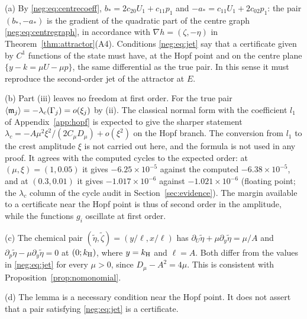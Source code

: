 \begin{remark}\label{neg:rem:jet}
(a) By \eqref{neg:eq:centrecoeff}, $b_*=2c_{20}U_1+c_{11}p_1$ and $-a_*=c_{11}U_1+2c_{02}p_1$: the pair $(b_*,-a_*)$ is the gradient of the quadratic part of the centre graph \eqref{neg:eq:centregraph}, in accordance with $\nabla h=(\zeta,-\eta)$ in Theorem~\ref{thm:attractor}(A4). Conditions \eqref{neg:eq:jet} say that a certificate given by $C^1$ functions of the state must have, at the Hopf point and on the centre plane $\{y-k=\mu U-\mu p\}$, the same differential as the true pair. In this sense it must reproduce the second-order jet of the attractor at $E$.

(b) Part (iii) leaves no freedom at first order. For the true pair $\left\langle \mathfrak m_j\right\rangle=-\lambda_c(\Gamma_j)=o(\xi_j)$ by (ii). The classical normal form with the coefficient $l_1$ of Appendix~\ref{app:hopf} is expected to give the sharper statement $\lambda_c=-A\mu^2\xi^2/(2C_\mu D_\mu)+o(\xi^2)$ on the Hopf branch. The conversion from $l_1$ to the crest amplitude $\xi$ is not carried out here, and the formula is not used in any proof. It agrees with the computed cycles to the expected order: at $(\mu,\xi)=(1,0.05)$ it gives $-6.25\times10^{-5}$ against the computed $-6.38\times10^{-5}$, and at $(0.3,0.01)$ it gives $-1.017\times10^{-6}$ against $-1.021\times10^{-6}$ (floating point; the $\lambda_c$ column of the cycle audit in Section~\ref{sec:evidence}). The margin available to a certificate near the Hopf point is thus of second order in the amplitude, while the functions $g_i$ oscillate at first order.

(c) The chemical pair $(\tilde\eta,\tilde\zeta)=(y/\ell,x/\ell)$ has $\partial_U\tilde\eta+\mu\partial_y\tilde\eta=\mu/A$ and $\partial_p\tilde\eta-\mu\partial_y\tilde\eta=0$ at $(0;k_{\mathrm H})$, where $y=k_{\mathrm H}$ and $\ell=A$. Both differ from the values in \eqref{neg:eq:jet} for every $\mu>0$, since $D_\mu-A^2=4\mu$. This is consistent with Proposition~\ref{prop:nomonomial}.

(d) The lemma is a necessary condition near the Hopf point. It does not assert that a pair satisfying \eqref{neg:eq:jet} is a certificate.
\end{remark}

